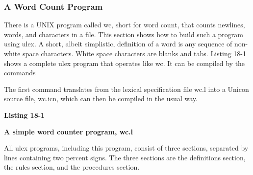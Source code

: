\subsubsection{A Word Count Program}

There is a UNIX program called \textsf{wc}, short for word count, that counts newlines, words, and characters in a
file. This section shows how to build such a program using
\textsf{ulex}. A short, albeit simplistic, definition of a word is any
sequence of non-white space characters. White space characters are
blanks and tabs. Listing 18-1 shows a complete \textsf{ulex} program that
operates like \textsf{wc}.  It can be compiled by the commands


The first command translates from the lexical specification file wc.l
into a Unicon source file, wc.icn, which can then be compiled in the
usual way.

\bigskip

{\sffamily\bfseries
Listing 18-1}

{\sffamily\bfseries
A simple word counter program, wc.l}


All \textsf{ulex} programs, including this program, consist of three
sections, separated by lines containing two percent signs. The three
sections are the definitions section, the rules section, and the
procedures section.

